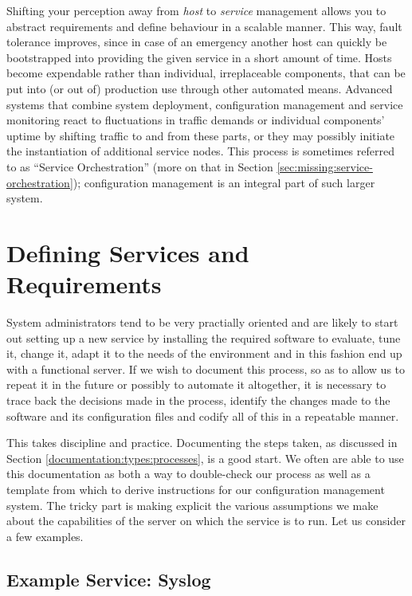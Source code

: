 Shifting your perception away from {\em host} to {\em
service} management allows you to abstract
requirements and define behaviour in a scalable
manner.  This way, fault tolerance improves, since in
case of an emergency another host can quickly be
bootstrapped into providing the given service in a
short amount of time.  Hosts become expendable rather
than individual, irreplaceable components, that can be
put into (or out of) production use through other
automated means.  Advanced systems that combine system
deployment, configuration management and service
monitoring react to fluctuations in traffic demands or
individual components' uptime by shifting traffic to
and from these parts, or they may possibly initiate
the instantiation of additional service nodes.  This
process is sometimes referred to as ``Service
Orchestration'' (more on
that in Section
\ref{sec:missing:service-orchestration});
configuration management is an integral part of such
larger system.

\section{Defining Services and Requirements}
\label{configuration-management:defining-services}

System administrators tend to be very practially
oriented and are likely to start out setting up a new
service by installing the required software to
evaluate, tune it, change it, adapt it to the needs of
the environment and in this fashion end up with a
functional server.  If we wish to document this
process, so as to allow us to repeat it in the future
or possibly to automate it altogether, it is necessary
to trace back the decisions made in the process,
identify the changes made to the software and its
configuration files and codify all of this in a
repeatable manner.

This takes discipline and practice.  Documenting the
steps taken, as discussed in Section
\ref{documentation:types:processes}, is a good start.
We often are able to use this documentation as both a
way to double-check our process as well as a template
from which to derive instructions for our
configuration management system.  The tricky part is
making explicit the various assumptions we make about
the capabilities of the server on which the service is
to run.  Let us consider a few examples.

\subsection{Example Service: Syslog}
\label{configuration-management:defining-services:syslog}

